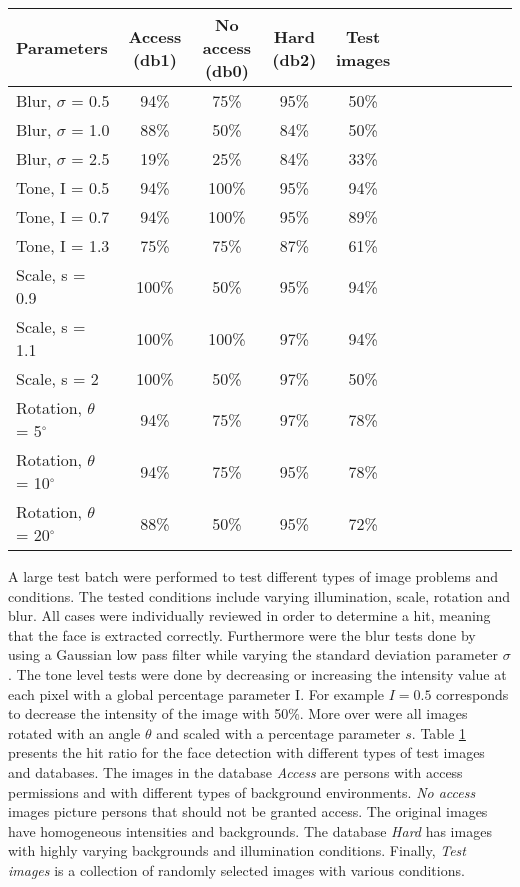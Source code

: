 \begin{table}[H]
  \label{tb:result}
\begin{tabular}{l*{10}{c}r}
\hline
Parameters & Access (db1) & No access (db0) & Hard (db2) & Test images \\
\hline
Blur, $\sigma$ = 0.5  & 94\% 	& 75\% 		& 95\% 		& 50\%  \\ \hline
Blur, $\sigma$ = 1.0  & 88\% 		& 50\% 		& 84\% 	& 50\% \\ \hline
Blur, $\sigma$ = 2.5  & 19\% 	& 25\% 		& 84\% 		& 33\% \\ \hline
Tone, I = 0.5  		& 94\% 	& 100\%	 		& 95\%		& 94\% \\ \hline
Tone, I = 0.7  		& 94\%		& 100\%   	    & 95\% 	& 89\% 	\\ \hline
Tone, I = 1.3  		& 75\%		& 75\%		& 87\% 	& 61\% 	 \\ \hline
Scale, s = 0.9 		& 100\% 		& 50\% 		& 95\% 	& 94\% 	 \\ \hline
Scale, s = 1.1  		& 100\% 		& 100\% 		& 97\% 	& 94\%		  \\ \hline
Scale, s = 2  			& 100\% 		& 50\%		& 97\% 	& 50\%		  \\ \hline
Rotation, $\theta$ = 5$^{\circ}$  	& 94\% 	& 75\%		& 97\% 		& 78\% 	 \\ \hline
Rotation, $\theta$ = 10$^{\circ}$   & 94\% 	& 75\%		& 95\% 		& 78\% 	 \\ \hline
Rotation, $\theta$ = 20$^{\circ}$  & 88\% 		& 50\%		& 95\% 	& 72\% 	 \\ \hline
\end{tabular}
\end{table}

A large test batch were performed to test different types of image problems and conditions. The tested conditions include varying illumination, scale, rotation and blur. All cases were individually reviewed in order to determine a hit, meaning that the face is extracted correctly. Furthermore were the blur tests done by using a Gaussian low pass filter while varying the standard deviation parameter $\sigma$.
The tone level tests were done by decreasing or increasing the intensity value at each pixel with a global percentage parameter I. For example $I = 0.5$ corresponds to decrease the intensity of the image with 50\%.
More over were all images rotated with an angle $\theta$ and scaled with a percentage parameter $s$.
\newline
\indent Table \ref{tb:result} presents the hit ratio for the face detection with different types of test images and databases.
The images in the database \textit{Access} are persons with access permissions and with different types of background environments.
\textit{No access} images picture persons that should not be granted access. The original images have homogeneous intensities and backgrounds.
The database \textit{Hard} has images with highly varying backgrounds and illumination conditions. Finally, \textit{Test images} is a collection of randomly selected images with various conditions.
